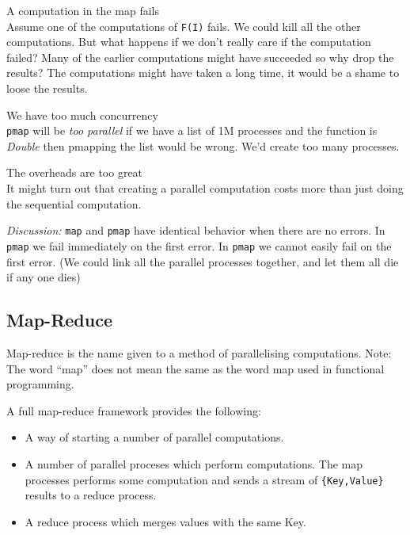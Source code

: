 \documentclass[10pt]{article}
\begin{document}
\begin{description}

\item A computation in the map fails\\ 
Assume one of the computations of
\verb+F(I)+ fails. We could kill all the other computations. But
what happens if we don't really care if the computation failed? Many
of the earlier computations might have succeeded so why drop the
results? The computations might have taken a long time, it would be a  shame to
loose the results.

\item We have too much concurrency\\
\verb+pmap+ will be {\sl too parallel} if we have a list of 1M processes
and the function is {\sl Double} then pmapping the list would be wrong.
We'd create too many processes.

\item The overheads are too great\\
It might turn out that creating a parallel computation
costs more than just doing the sequential computation.

\end{description}

{\sl Discussion:} \verb+map+ and \verb+pmap+ have identical behavior
when there are no errors. In \verb+pmap+ we fail immediately on the
first error. In \verb+pmap+ we cannot easily fail on the first error.
(We could link all the parallel processes together, and let them all
die if any one dies)

\subsection{Map-Reduce}

Map-reduce is the name given to a method of parallelising
computations.  Note: The word ``map'' does not mean the same as the
word map used in functional programming. 

A full map-reduce framework provides the following:

\begin{itemize}

\item A way of starting a number of parallel computations.

\item A number of parallel proceses which perform computations. The map processes
  performs some computation and sends a stream of \verb+{Key,Value}+
  results to a reduce process.
  
\item A reduce process which merges values with the same Key.
\end{itemize}
\end{document}
